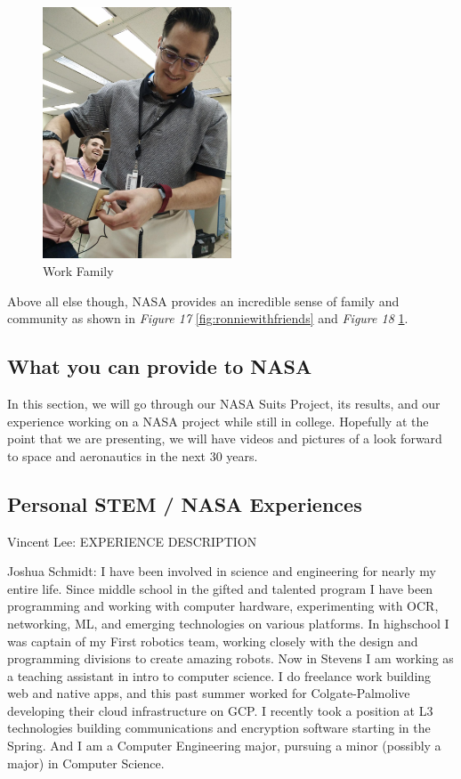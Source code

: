 \documentclass{article}
\let\Oldsubsection\subsection
\renewcommand{\subsection}{\FloatBarrier\Oldsubsection}
\begin{document}
\begin{figure}[!htb]
  \centering
  \includegraphics[width=0.5\textwidth]{assets/guywithpsu.jpg}
  \caption{Work Family}
  \label{fig:guywithpsu}
\end{figure}

Above all else though, NASA provides an incredible sense of family and 
community as shown in \textit{Figure 17} \ref{fig:ronniewithfriends} and 
\textit{Figure 18} \ref{fig:guywithpsu}.

\subsection{What you can provide to NASA}

In this section, we will go through our NASA Suits Project, its results, 
and our experience working on a NASA project while still in college. 
Hopefully at the point that we are presenting, we will have videos and 
pictures of a look forward to space and aeronautics in the next 30 
years.

\subsection{Personal STEM / NASA Experiences}

Vincent Lee: EXPERIENCE DESCRIPTION

Joshua Schmidt: I have been involved in science and engineering for 
nearly my entire life. Since middle school in the gifted and talented 
program I have been programming and working with computer hardware, 
experimenting with OCR, networking, ML, and emerging technologies on 
various platforms. In highschool I was captain of my First robotics 
team, working closely with the design and programming divisions to 
create amazing robots. Now in Stevens I am working as a teaching 
assistant in intro to computer science. I do freelance work building web 
and native apps, and this past summer worked for Colgate-Palmolive 
developing their cloud infrastructure on GCP. I recently took a position 
at L3 technologies building communications and encryption software 
starting in the Spring. And I am a Computer Engineering major, pursuing 
a minor (possibly a major) in Computer Science.
\end{document}
